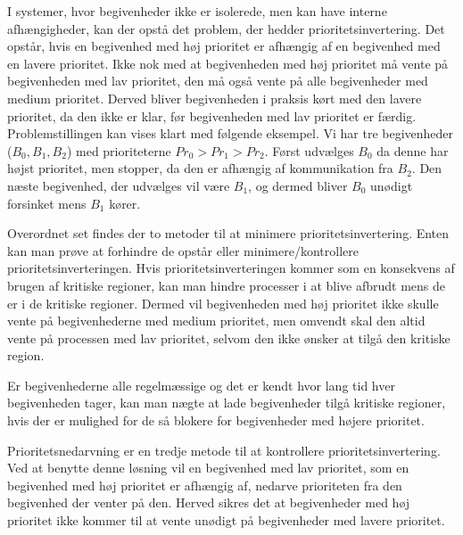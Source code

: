 I systemer, hvor begivenheder ikke er isolerede, men kan have interne afhængigheder, kan der opstå det problem, der hedder prioritetsinvertering\cite{sha1990priority}. Det opstår, hvis en begivenhed med høj prioritet er afhængig af en begivenhed med en lavere prioritet. Ikke nok med at begivenheden med høj prioritet må vente på begivenheden med lav prioritet, den må også vente på alle begivenheder med medium prioritet. Derved bliver begivenheden i praksis kørt med den lavere prioritet, da den ikke er klar, før begivenheden med lav prioritet er færdig. Problemstillingen kan vises klart med følgende eksempel. Vi har tre begivenheder ($B_0,B_1,B_2$) med prioriteterne $Pr_0>Pr_1>Pr_2$. Først udvælges $B_0$ da denne har højst prioritet, men stopper, da den er afhængig af kommunikation fra $B_2$. Den næste begivenhed, der udvælges vil være $B_1$, og dermed bliver $B_0$ unødigt forsinket mens $B_1$ kører.

Overordnet set findes der to metoder til at minimere prioritetsinvertering. Enten kan man prøve at forhindre de opstår eller minimere/kontrollere prioritetsinverteringen. 
Hvis prioritetsinverteringen kommer som en konsekvens af brugen af kritiske regioner, kan man hindre processer i at blive afbrudt mens de er i de kritiske regioner. Dermed vil begivenheden med høj prioritet ikke skulle vente på begivenhederne med medium prioritet, men omvendt skal den altid vente på processen med lav prioritet, selvom den ikke ønsker at tilgå den kritiske region. 

Er begivenhederne alle regelmæssige og det er kendt hvor lang tid hver begivenheden tager, kan man nægte at lade begivenheder tilgå kritiske regioner, hvis der er mulighed for de så blokere for begivenheder med højere prioritet.

Prioritetsnedarvning er en tredje metode til at kontrollere prioritetsinvertering\cite{sha1990priority}. Ved at benytte denne løsning vil en begivenhed med lav prioritet, som en begivenhed med høj prioritet er afhængig af, nedarve prioriteten fra den begivenhed der venter på den. Herved sikres det at begivenheder med høj prioritet ikke kommer til at vente unødigt på begivenheder med lavere prioritet. 


